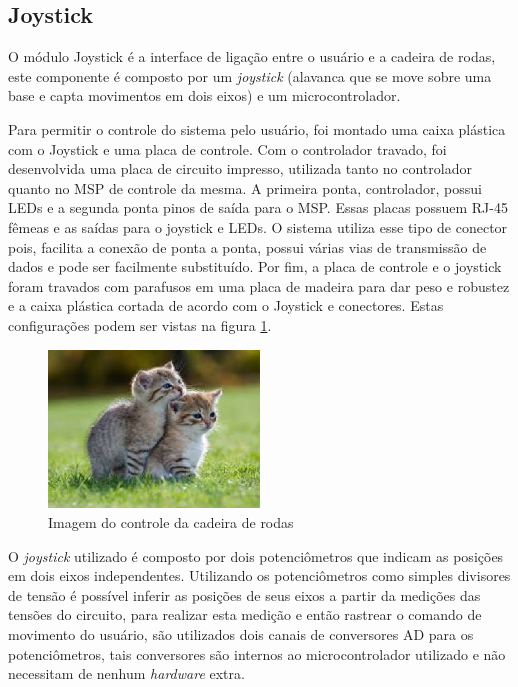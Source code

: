 \subsection{Joystick}
\label{ssec:joystick}
O módulo Joystick é a interface de ligação entre o usuário e a cadeira de rodas, este componente é composto por um \textit{joystick} (alavanca que se move sobre uma base e capta movimentos em dois eixos) e um microcontrolador.

Para permitir o controle do sistema pelo usuário, foi montado uma caixa plástica com o Joystick e uma placa de controle. Com o controlador travado, foi desenvolvida uma placa de circuito impresso, utilizada tanto no controlador quanto no MSP de controle da mesma. A primeira ponta, controlador, possui LEDs e a segunda ponta pinos de saída para o MSP. Essas placas possuem RJ-45 fêmeas e as saídas para o joystick e LEDs. O sistema utiliza esse tipo de conector pois, facilita a conexão de ponta a ponta, possui várias vias de transmissão de dados e pode ser facilmente substituído. Por fim, a placa de controle e o joystick foram travados com parafusos em uma placa de madeira para dar peso e robustez e a caixa plástica cortada de acordo com o Joystick e conectores. Estas configurações podem ser vistas na figura \ref{fig:joy_hand_control}.

\begin{figure}[!htb]
\centering
\includegraphics[width = 0.5\textwidth]{figuras/resultados/joy_hand_control}
\caption{Imagem do controle da cadeira de rodas}
\label{fig:joy_hand_control}
\end{figure}

O \textit{joystick} utilizado é composto por dois potenciômetros que indicam as posições em dois eixos independentes. Utilizando os potenciômetros como simples divisores de tensão é possível inferir as posições de seus eixos a partir da medições das tensões do circuito, para realizar esta medição e então rastrear o comando de movimento do usuário, são utilizados dois canais de conversores AD para os potenciômetros, tais conversores são internos ao microcontrolador utilizado e não necessitam de nenhum \textit{hardware} extra.

